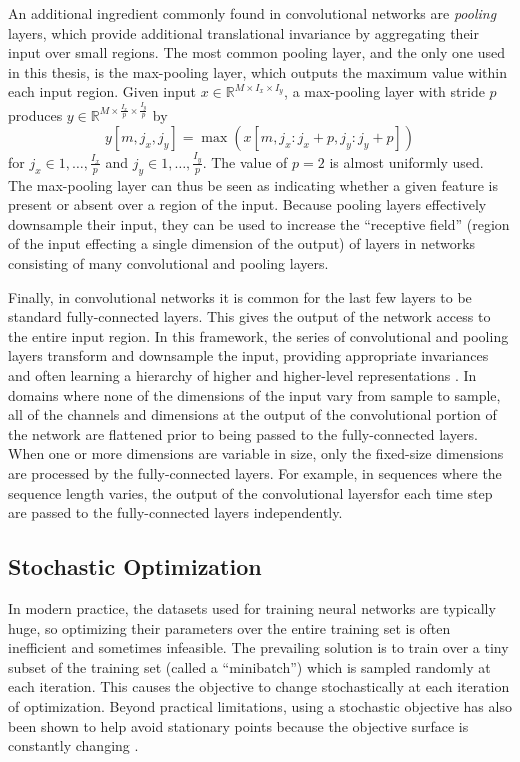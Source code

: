 An additional ingredient commonly found in convolutional networks are {\em pooling} layers, which provide additional translational invariance by aggregating their input over small regions.
The most common pooling layer, and the only one used in this thesis, is the max-pooling layer, which outputs the maximum value within each input region.
Given input $x \in \mathbb{R}^{M \times I_x \times I_y}$, a max-pooling layer with stride $p$ produces $y \in \mathbb{R}^{M \times \frac{I_x}{p} \times \frac{I_y}{p}}$ by
\begin{equation}
y[m, j_x, j_y] = \max(x[m, j_x:j_x + p, j_y:j_y + p])
\end{equation}
for $j_x \in 1, \ldots, \frac{I_x}{p}$ and $j_y \in 1, \ldots, \frac{I_y}{p}$.
The value of $p = 2$ is almost uniformly used.
The max-pooling layer can thus be seen as indicating whether a given feature is present or absent over a region of the input.
Because pooling layers effectively downsample their input, they can be used to increase the ``receptive field'' (region of the input effecting a single dimension of the output) of layers in networks consisting of many convolutional and pooling layers.

Finally, in convolutional networks it is common for the last few layers to be standard fully-connected layers.
This gives the output of the network access to the entire input region.
In this framework, the series of convolutional and pooling layers transform and downsample the input, providing appropriate invariances and often learning a hierarchy of higher and higher-level representations \cite{}.
In domains where none of the dimensions of the input vary from sample to sample, all of the channels and dimensions at the output of the convolutional portion of the network are flattened prior to being passed to the fully-connected layers.
When one or more dimensions are variable in size, only the fixed-size dimensions are processed by the fully-connected layers.
For example, in sequences where the sequence length varies, the output of the convolutional layersfor each time step are passed to the fully-connected layers independently.

\subsection{Stochastic Optimization}

In modern practice, the datasets used for training neural networks are typically huge, so optimizing their parameters over the entire training set is often inefficient and sometimes infeasible.
The prevailing solution is to train over a tiny subset of the training set (called a ``minibatch'') which is sampled randomly at each iteration.
This causes the objective to change stochastically at each iteration of optimization.
Beyond practical limitations, using a stochastic objective has also been shown to help avoid stationary points because the objective surface is constantly changing \cite{}.

